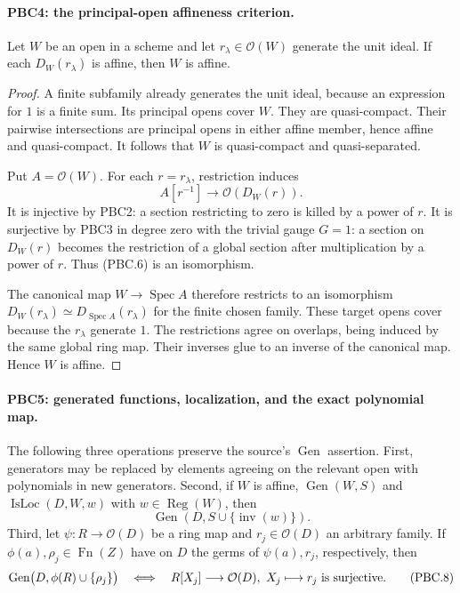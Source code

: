 \paragraph{PBC4: the principal-open affineness criterion.}
\label{claim:PBC4}
Let $W$ be an open in a scheme and let $r_\lambda\in\mathcal O(W)$
generate the unit ideal.  If each $D_W(r_\lambda)$ is affine,
then $W$ is affine.

\begin{proof}
A finite subfamily already generates the unit ideal, because an
expression for $1$ is a finite sum.  Its principal opens cover $W$.
They are quasi-compact.  Their pairwise intersections are principal
opens in either affine member, hence affine and quasi-compact.
It follows that $W$ is quasi-compact and quasi-separated.

Put $A=\mathcal O(W)$.  For each $r=r_\lambda$, restriction induces
\[
 A[r^{-1}]\longrightarrow\mathcal O(D_W(r)).
                                                        \tag{PBC.6}
\]
It is injective by PBC2: a section restricting to zero is killed by a
power of $r$.  It is surjective by PBC3 in degree zero with the
trivial gauge $G=1$: a section on $D_W(r)$ becomes the restriction
of a global section after multiplication by a power of $r$.
Thus (PBC.6) is an isomorphism.

The canonical map $W\to\operatorname{Spec}A$ therefore restricts
to an isomorphism $D_W(r_\lambda)\simeq
D_{\operatorname{Spec}A}(r_\lambda)$ for the finite chosen family.
These target opens cover because the $r_\lambda$ generate $1$.
The restrictions agree on overlaps, being induced by the same
global ring map.  Their inverses glue to an inverse of the
canonical map.  Hence $W$ is affine.
\end{proof}

\paragraph{PBC5: generated functions, localization, and the exact polynomial map.}
\label{claim:PBC5}
The following three operations preserve the source's
$\operatorname{Gen}$ assertion.
First, generators may be replaced by elements agreeing on the
relevant open with polynomials in new generators.
Second, if $W$ is affine,
$\operatorname{Gen}(W,S)$ and
$\operatorname{IsLoc}(D,W,w)$ with $w\in\operatorname{Reg}(W)$,
then
\[
 \operatorname{Gen}(D,S\cup\{\operatorname{inv}(w)\}).
                                                        \tag{PBC.7}
\]
Third, let $\psi:R\to\mathcal O(D)$ be a ring map and
$r_j\in\mathcal O(D)$ an arbitrary family.  If
$\phi(a),\rho_j\in\operatorname{Fn}(Z)$ have on $D$ the germs
of $\psi(a),r_j$, respectively, then
\[
 \operatorname{Gen}\bigl(D,\phi(R)\cup\{\rho_j\}\bigr)
 \quad\Longleftrightarrow\quad
 R[X_j]\longrightarrow\mathcal O(D),\
 X_j\longmapsto r_j
 \ \hbox{is surjective}.
                                                        \tag{PBC.8}
\]

